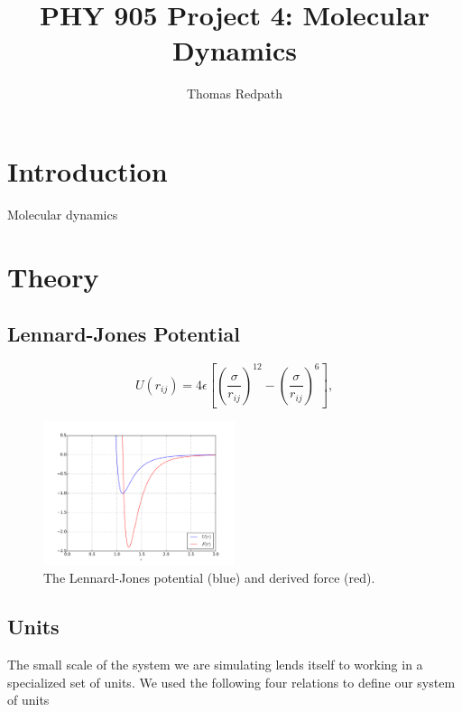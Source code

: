 \documentclass[10pt,showpacs,preprintnumbers,footinbib,amsmath,amssymb,aps,prl,twocolumn,groupedaddress,superscriptaddress,showkeys]{revtex4-1}
\begin{document}
\title{PHY 905 Project 4: Molecular Dynamics}
\author{Thomas Redpath}
\begin{abstract}

\end{abstract}
\maketitle

\section{Introduction}

Molecular dynamics


\section{Theory}

\subsection*{Lennard-Jones Potential}


\begin{equation}
	U(r_{ij}) = 4\epsilon\left[\left(\frac{\sigma}{r_{ij}}\right)^{12} - \left(\frac{\sigma}{r_{ij}}\right)^6\right],
	\label{eq:lj}
\end{equation}

\begin{figure}
	\centering
	\includegraphics[width=0.5\textwidth]{figures/LJ.pdf}
	\caption{The Lennard-Jones potential (blue) and derived force (red).}
	\label{fig:lj}
\end{figure}

\subsection*{Units}

The small scale of the system we are simulating lends itself to working in a
specialized set of units. We used the following four relations to define our
system of units
\end{document}
